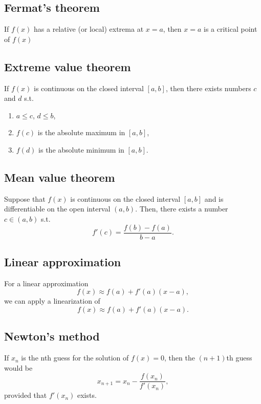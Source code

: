 \documentclass[main.tex]{subfiles}
\begin{document}
	\subsection*{Fermat's theorem}
	\begin{theorem}
	If \(f(x)\) has a relative (or local) extrema at \(x = a\), then \(x = a\) is a critical point of \(f(x)\)
	\end{theorem}

	\subsection*{Extreme value theorem}
	\begin{theorem}
	If \(f(x)\) is continuous on the closed interval \([a, b]\), then there exists numbers \(c\) and \(d\) s.t.
	\begin{enumerate}
		\item \(a \leq c\), \(d \leq b\),
		\item \(f(c)\) is the absolute maximum in \([a, b]\),
		\item \(f(d)\) is the absolute minimum in \([a, b]\).
	\end{enumerate}
	\end{theorem}

	\subsection*{Mean value theorem}
	\begin{theorem}
	Suppose that \(f(x)\) is continuous on the closed interval \([a, b]\) and is differentiable on the open interval \((a, b)\).
	Then, there exists a number \(c \in (a, b)\) s.t. \[f'(c) = \frac{f(b) - f(a)}{b - a}.\]
	\end{theorem}

	\subsection*{Linear approximation}
	For a linear approximation \[f(x) \approx f(a) + f'(a)(x - a),\] we can apply a linearization of \[f(x) \approx f(a) + f'(a)(x - a).\]

	\subsection*{Newton's method}
	\begin{definition}
	If \(x_n\) is the nth guess for the solution of \(f(x) = 0\), then the \((n + 1)\)th guess would be \[x_{n+1} = x_n - \frac{f(x_n)}{f'(x_n)},\] provided that \(f'(x_n)\) exists.
	\end{definition}
\end{document}
